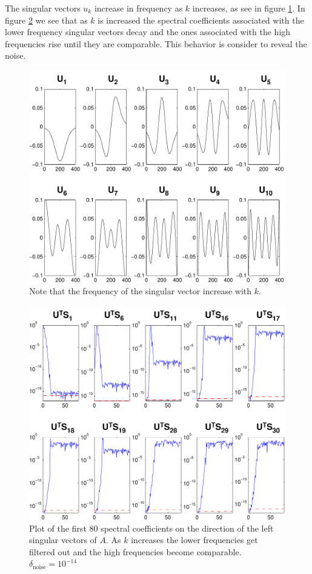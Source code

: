 \documentclass[11pt]{amsart}
\begin{document}
The singular vectors $u_{k}$ increase in frequency as $k$ increases, as 
see in figure \ref{fig:singularVectors}.
In figure \ref{fig:spectralCoeffs} we see that as $k$
is increased the spectral coefficients associated with the lower frequency 
singular vectors decay and the ones associated with the high frequencies rise 
until they are comparable. This behavior is consider to reveal the noise.
\begin{figure}[b] \label{fig:singularVectors}
  \begin{center}
    \includegraphics[width=0.55\linewidth]{figures/run1/sing_vecs}
  \end{center}
\caption{Note that the frequency of the singular vector increase with $k$.}
\end{figure}
\begin{figure}[htb] \label{fig:spectralCoeffs}
  \begin{center}
    \includegraphics[width=0.55\linewidth]{figures/run1/spec_sk}
  \end{center}
\caption{Plot of the first 80 spectral coefficients on the direction of the left
singular vectors of $A$. As $k$ increases the lower frequencies get filtered out
and the high frequencies become comparable. $\delta_{\text{noise}} = 10^{-14}$}
\end{figure}
\end{document}
